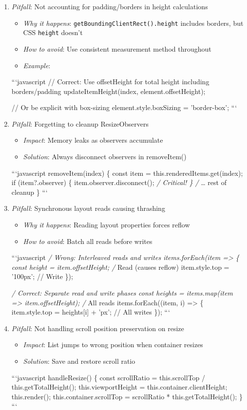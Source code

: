 \documentclass[11pt]{article}
\begin{document}
\begin{enumerate}
\item \emph{Pitfall}: Not accounting for padding/borders in height calculations
\begin{itemize}
\item \emph{Why it happens}: \texttt{getBoundingClientRect().height} includes borders, but CSS \texttt{height} doesn't
\item \emph{How to avoid}: Use consistent measurement method throughout
\item \emph{Example}:
\end{itemize}
```javascript
// Correct: Use offsetHeight for total height including borders/padding
updateItemHeight(index, element.offsetHeight);

// Or be explicit with box-sizing
element.style.boxSizing = 'border-box';
```

\item \emph{Pitfall}: Forgetting to cleanup ResizeObservers
\begin{itemize}
\item \emph{Impact}: Memory leaks as observers accumulate
\item \emph{Solution}: Always disconnect observers in removeItem()
\end{itemize}
```javascript
removeItem(index) \{
  const item = this.renderedItems.get(index);
  if (item?.observer) \{
    item.observer.disconnect(); \emph{/ Critical!
  \}
  /} \ldots{} rest of cleanup
\}
```

\item \emph{Pitfall}: Synchronous layout reads causing thrashing
\begin{itemize}
\item \emph{Why it happens}: Reading layout properties forces reflow
\item \emph{How to avoid}: Batch all reads before writes
\end{itemize}
```javascript
\emph{/ Wrong: Interleaved reads and writes
items.forEach(item => \{
  const height = item.offsetHeight; /} Read (causes reflow)
  item.style.top = '100px'; // Write
\});

\emph{/ Correct: Separate read and write phases
const heights = items.map(item => item.offsetHeight); /} All reads
items.forEach((item, i) => \{
  item.style.top = heights[i] + 'px'; // All writes
\});
```

\item \emph{Pitfall}: Not handling scroll position preservation on resize
\begin{itemize}
\item \emph{Impact}: List jumps to wrong position when container resizes
\item \emph{Solution}: Save and restore scroll ratio
\end{itemize}
```javascript
handleResize() \{
  const scrollRatio = this.scrollTop / this.getTotalHeight();
  this.viewportHeight = this.container.clientHeight;
  this.render();
  this.container.scrollTop = scrollRatio * this.getTotalHeight();
\}
```
\end{enumerate}
\end{document}
